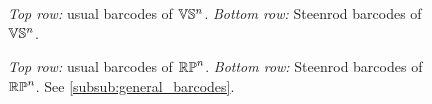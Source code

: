 %
%




\begin{figure}
	\centering
	
	\caption{\emph{Top row:} usual barcodes of $\mathbb{V}\mathbb{S}^n$. \emph{Bottom row:} Steenrod barcodes of $\mathbb{V}\mathbb{S}^n$. }
	\label{fig:barcodes}
\end{figure}

\begin{figure}
	\centering
	
	\caption{\emph{Top row:} usual barcodes of $\mathbb{RP}^n$. \emph{Bottom row:} Steenrod barcodes of $\mathbb{RP}^n$. See \cref{subsub:general_barcodes}.}
	\label{fig:sq barcodes}
\end{figure}

